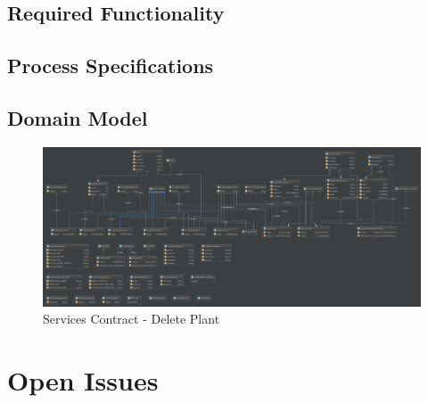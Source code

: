 \documentclass{article}
\begin{document}
	\subsection{Required Functionality}
	\subsection{Process Specifications}
	
	
	\begin{landscape}
		\subsection{Domain Model}
		\begin{figure}[H]
			\includegraphics[width=\linewidth]{../images/aworldofplants_domain.png}
			\caption{Services Contract - Delete Plant}
		\end{figure}
	\end{landscape}

\newpage
\section{Open Issues}
\end{document}
